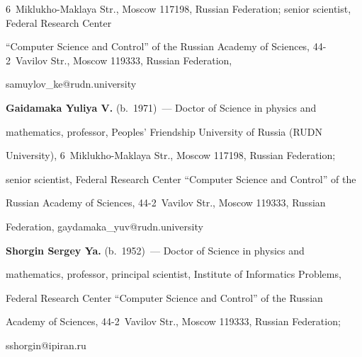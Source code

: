 6~Miklukho-Maklaya Str., Moscow 117198, Russian Federation; senior scientist, Federal Research Center 

``Computer Science and Control'' of the Russian Academy of Sciences, 44-2~Vavilov Str., Moscow 119333, Russian Federation, 

\mbox{samuylov\_ke@rudn.university}



\vspace*{1pt}



\noindent

\textbf{Gaidamaka Yuliya V.} (b.\ 1971)~--- Doctor of Science in physics and 

mathematics, professor, Peoples' Friendship University of Russia (RUDN 

University), 6~Miklukho-Maklaya Str., Moscow 117198, Russian Federation; 

senior scientist, Federal Research Center ``Computer Science and Control'' of the 

Russian Academy of Sciences, 44-2~Vavilov Str., Moscow 119333, Russian 

Federation, \mbox{gaydamaka\_yuv@rudn.university}



\vspace*{1pt}



\noindent

\textbf{Shorgin Sergey Ya.} (b.\ 1952)~--- Doctor of Science in physics and 

mathematics, professor, principal scientist, Institute of Informatics Problems, 

Federal Research Center ``Computer Science and Control'' of the Russian 

Academy of Sciences, 44-2~Vavilov Str., Moscow 119333, Russian Federation; 

\mbox{sshorgin@ipiran.ru}

\label{end\stat}



\renewcommand{\bibname}{\protect\rm Литература}       

